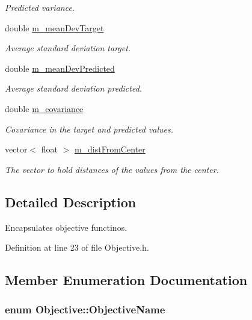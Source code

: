 \begin{DoxyCompactItemize}
\begin{DoxyCompactList}\small\item\em Predicted variance. \end{DoxyCompactList}\item 
double \hyperlink{classObjective_ac48b9550f4153a2cb72606f1bab7f024}{m\+\_\+mean\+Dev\+Target}
\begin{DoxyCompactList}\small\item\em Average standard deviation target. \end{DoxyCompactList}\item 
double \hyperlink{classObjective_adaebe7ea3f61983ad40915331c665097}{m\+\_\+mean\+Dev\+Predicted}
\begin{DoxyCompactList}\small\item\em Average standard deviation predicted. \end{DoxyCompactList}\item 
double \hyperlink{classObjective_a37cee3bff8dbebd5399bfabf5434f4d0}{m\+\_\+covariance}
\begin{DoxyCompactList}\small\item\em Covariance in the target and predicted values. \end{DoxyCompactList}\item 
vector$<$ float $>$ \hyperlink{classObjective_a762220972dd5dcf5c6051b39ba417682}{m\+\_\+dist\+From\+Center}
\begin{DoxyCompactList}\small\item\em The vector to hold distances of the values from the center. \end{DoxyCompactList}\end{DoxyCompactItemize}


\subsection{Detailed Description}
Encapsulates objective functinos. 

Definition at line 23 of file Objective.\+h.



\subsection{Member Enumeration Documentation}
\subsubsection[{\texorpdfstring{Objective\+Name}{ObjectiveName}}]{\setlength{\rightskip}{0pt plus 5cm}enum {\bf Objective\+::\+Objective\+Name}\hspace{0.3cm}{\ttfamily [private]}}\hypertarget{classObjective_ac2cb31fca71c5a4b99b35c879742644c}{}\label{classObjective_ac2cb31fca71c5a4b99b35c879742644c}


